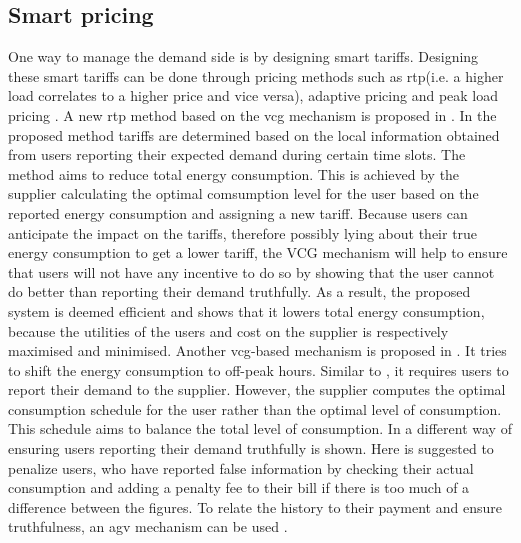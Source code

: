 \subsection{Smart pricing}
One way to manage the demand side is by designing smart tariffs. Designing these smart tariffs can be done through pricing methods such as \ac{rtp}(i.e. a higher load correlates to a higher price and vice versa), adaptive pricing and peak load pricing \cite{SamadiMohsenian-RadSchoberEtAl2012}. A new \ac{rtp} method based on the \ac{vcg} mechanism is proposed in \cite{SamadiMohsenian-RadSchoberEtAl2012}. In the proposed method tariffs are determined based on the local information obtained from users reporting their expected demand during certain time slots. The method aims to reduce total energy consumption. This is achieved by the supplier calculating the optimal comsumption level for the user based on the reported energy consumption and assigning a new tariff. Because users can anticipate the impact on the tariffs, therefore possibly lying about their true energy consumption to get a lower tariff, the VCG mechanism will help to ensure that users will not have any incentive to do so by showing that the user cannot do better than reporting their demand truthfully. As a result, the proposed system is deemed efficient and shows that it lowers total energy consumption, because the utilities of the users and cost on the supplier is respectively maximised and minimised. Another \ac{vcg}-based mechanism is proposed in \cite{SamadiSchoberWong2011}. It tries to shift the energy consumption to off-peak hours. Similar to \cite{SamadiMohsenian-RadSchoberEtAl2012}, it requires users to report their demand to the supplier. However, the supplier computes the optimal consumption schedule for the user rather than the optimal level of consumption. This schedule aims to balance the total level of consumption.
In \cite{MaDengSongEtAl2014} a different way of ensuring users reporting their demand truthfully is shown. Here is suggested to penalize users, who have reported false information by checking their actual consumption and adding a penalty fee to their bill if there is too much of a difference between the figures. To relate the history to their payment and ensure truthfulness, an \ac{agv} mechanism can be used \cite{MaDengSongEtAl2014}.


